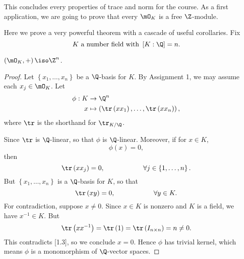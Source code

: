 \documentclass[pmath441]{subfiles}
\begin{document}
    \rruleline
    
    \np This concludes every properties of trace and norm for the course. As a first application, we are going to prove that every $\mO_K$ is a free $\Z$-module.

    \clearpage

    Here we prove a very powerful theorem with a cascade of useful corollaries. Fix
    \begin{equation*}
        K\text{ a number field with }\left[ K:\Q \right]=n.
    \end{equation*}

    \begin{theorem}{}
        $\left( \mO_K,+ \right)\iso\Z^n$.
    \end{theorem}

    \begin{proof}
        Let $\left\lbrace x_1,\ldots,x_n \right\rbrace$ be a $\Q$-basis for $K$. By Assignment 1, we may assume each $x_j\in\mO_K$. Let
        \begin{equation*}
            \begin{aligned}
                \phi:K&\to\Q^n \\
                x & \mapsto \left( \tr\left( xx_1 \right), \ldots, \tr\left( xx_n \right) \right),
            \end{aligned} 
        \end{equation*}
        where $\tr$ is the shorthand for $\tr_{K /\Q}$.

        Since $\tr$ is $\Q$-linear, so that $\phi$ is $\Q$-linear. Moreover, if for $x\in K$,
        \begin{equation*}
            \phi\left( x \right) = 0,
        \end{equation*}
        then
        \begin{equation*}
            \tr\left( xx_j \right) = 0, \hspace{2cm}\forall j\in\left\lbrace 1,\ldots,n \right\rbrace.
        \end{equation*}
        But $\left\lbrace x_1,\ldots,x_n \right\rbrace$ is a $\Q$-basis for $K$, so that
        \begin{equation}
            \tr\left( xy \right) = 0, \hspace{2cm}\forall y\in K.
        \end{equation}
        For contradiction, suppose $x\neq 0$. Since $x\in K$ is nonzero and $K$ is a field, we have $x^{-1}\in K$. But
        \begin{equation*}
            \tr\left( xx^{-1} \right) = \tr\left( 1 \right) = \tr\left( I_{n\times n} \right) = n \neq 0.
        \end{equation*}
        This contradicts [1.3], so we conclude $x=0$. Hence $\phi$ has trivial kernel, which means $\phi$ is a monomorphism of $\Q$-vector spaces.


\end{proof}
\end{document}
